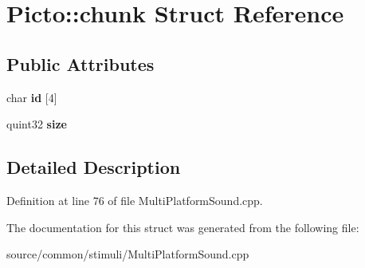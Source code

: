 \hypertarget{struct_picto_1_1chunk}{\section{Picto\-:\-:chunk Struct Reference}
\label{struct_picto_1_1chunk}
}
\subsection*{Public Attributes}
\begin{DoxyCompactItemize}
\item 
\hypertarget{struct_picto_1_1chunk_adb10a5611a2f67a7b4d72954002ee98d}{char {\bfseries id} \mbox{[}4\mbox{]}}\label{struct_picto_1_1chunk_adb10a5611a2f67a7b4d72954002ee98d}

\item 
\hypertarget{struct_picto_1_1chunk_a4e8f9a82da20b837628ae3dc5ce79425}{quint32 {\bfseries size}}\label{struct_picto_1_1chunk_a4e8f9a82da20b837628ae3dc5ce79425}

\end{DoxyCompactItemize}


\subsection{Detailed Description}


Definition at line 76 of file Multi\-Platform\-Sound.\-cpp.



The documentation for this struct was generated from the following file\-:\begin{DoxyCompactItemize}
\item 
source/common/stimuli/Multi\-Platform\-Sound.\-cpp\end{DoxyCompactItemize}
